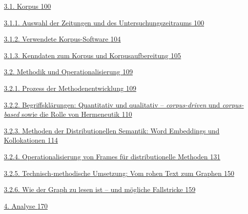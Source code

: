 \hyperref[korpus]{3.1. Korpus \hyperref[korpus]{100}}

\hyperref[auswahl-der-zeitungen-und-des-untersuchungszeitraums]{3.1.1. Auswahl der Zeitungen und des Untersuchungszeitraums \hyperref[auswahl-der-zeitungen-und-des-untersuchungszeitraums]{100}}

\hyperref[verwendete-korpus-software]{3.1.2. Verwendete Korpus-Software \hyperref[verwendete-korpus-software]{104}}

\hyperref[kenndaten-zum-korpus-und-korpusaufbereitung]{3.1.3. Kenndaten zum Korpus und Korpusaufbereitung \hyperref[kenndaten-zum-korpus-und-korpusaufbereitung]{105}}

\hyperref[methodik-und-operationalisierung]{3.2. Methodik und Operationalisierung \hyperref[methodik-und-operationalisierung]{109}}

\hyperref[prozess-der-methodenentwicklung]{3.2.1. Prozess der Methodenentwicklung \hyperref[prozess-der-methodenentwicklung]{109}}

\hyperref[begriffskluxe4rungen-quantitativ-und-qualitativ-corpus-driven-und-corpus-based-sowie-die-rolle-von-hermeneutik]{3.2.2. Begriffsklärungen: Quantitativ und qualitativ -- \emph{corpus-driven} und \emph{corpus-based} sowie die Rolle von Hermeneutik \hyperref[begriffskluxe4rungen-quantitativ-und-qualitativ-corpus-driven-und-corpus-based-sowie-die-rolle-von-hermeneutik]{110}}

\hyperref[methoden-der-distributionellen-semantik-word-embeddings-und-kollokationen]{3.2.3. Methoden der Distributionellen Semantik: Word Embeddings und Kollokationen \hyperref[methoden-der-distributionellen-semantik-word-embeddings-und-kollokationen]{114}}

\hyperref[operationalisierung-von-frames-fuxfcr-distributionelle-methoden]{3.2.4. Operationalisierung von Frames für distributionelle Methoden \hyperref[operationalisierung-von-frames-fuxfcr-distributionelle-methoden]{131}}

\hyperref[technisch-methodische-umsetzung-vom-rohen-text-zum-graphen]{3.2.5. Technisch-methodische Umsetzung: Vom rohen Text zum Graphen \hyperref[technisch-methodische-umsetzung-vom-rohen-text-zum-graphen]{150}}

\hyperref[wie-der-graph-zu-lesen-ist-und-muxf6gliche-fallstricke]{3.2.6. Wie der Graph zu lesen ist -- und mögliche Fallstricke \hyperref[wie-der-graph-zu-lesen-ist-und-muxf6gliche-fallstricke]{159}}

\hyperref[analyse]{4. Analyse \hyperref[analyse]{170}}


